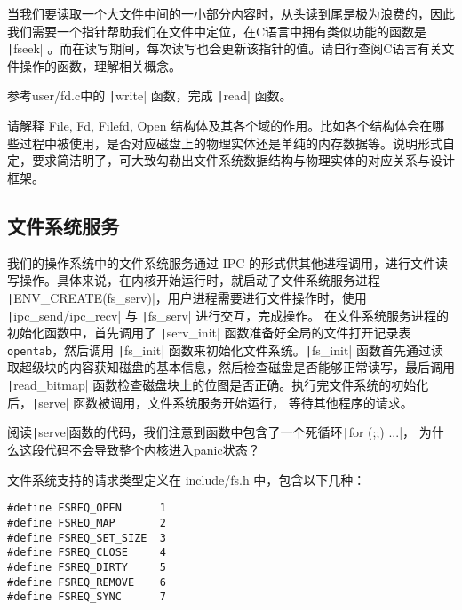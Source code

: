 当我们要读取一个大文件中间的一小部分内容时，从头读到尾是极为浪费的，因此我们需要一个指针帮助我们在文件中定位，在C语言中拥有类似功能的函数是 \texttt|fseek| 。而在读写期间，每次读写也会更新该指针的值。请自行查阅C语言有关文件操作的函数，理解相关概念。

\begin{exercise}
参考user/fd.c中的 \texttt|write| 函数，完成 \texttt|read| 函数。
\end{exercise}

\begin{thinking}\label{think-structures}请解释 File, Fd, Filefd, Open 结构体及其各个域的作用。比如各个结构体会在哪些过程中被使用，是否对应磁盘上的物理实体还是单纯的内存数据等。说明形式自定，要求简洁明了，可大致勾勒出文件系统数据结构与物理实体的对应关系与设计框架。	
\end{thinking}


\subsection{文件系统服务}

我们的操作系统中的文件系统服务通过 IPC 的形式供其他进程调用，进行文件读写操作。具体来说，在内核开始运行时，就启动了文件系统服务进程 \texttt|ENV_CREATE(fs_serv)|，用户进程需要进行文件操作时，使用 \texttt|ipc_send/ipc_recv| 与 \texttt|fs_serv| 进行交互，完成操作。
在文件系统服务进程的初始化函数中，首先调用了 \texttt|serv_init| 函数准备好全局的文件打开记录表
\texttt{opentab}，然后调用 \texttt|fs_init| 函数来初始化文件系统。\texttt|fs_init|
函数首先通过读取超级块的内容获知磁盘的基本信息，然后检查磁盘是否能够正常读写，最后调用 \texttt|read_bitmap|
函数检查磁盘块上的位图是否正确。执行完文件系统的初始化后，\texttt|serve| 函数被调用，文件系统服务开始运行，
等待其他程序的请求。

\begin{thinking}\label{think-fs-serve}
阅读\texttt|serve|函数的代码，我们注意到函数中包含了一个死循环\texttt|for (;;) {...}|，
为什么这段代码不会导致整个内核进入panic状态？
\end{thinking}

文件系统支持的请求类型定义在 include/fs.h 中，包含以下几种：

\begin{verbatim}
#define FSREQ_OPEN      1
#define FSREQ_MAP       2
#define FSREQ_SET_SIZE  3
#define FSREQ_CLOSE     4
#define FSREQ_DIRTY     5
#define FSREQ_REMOVE    6
#define FSREQ_SYNC      7
\end{verbatim}

